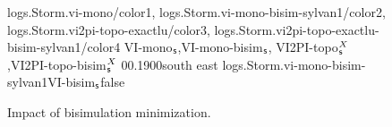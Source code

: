
\begin{figure*}[!htp]
	\centering
	{
		logs.Storm.vi-mono/color1,
		logs.Storm.vi-mono-bisim-sylvan1/color2,
		logs.Storm.vi2pi-topo-exactlu/color3,
		logs.Storm.vi2pi-topo-exactlu-bisim-sylvan1/color4
	}
	{VI-mono$_\textsf{s}$,VI-mono-bisim$_\textsf{s}$, VI2PI-topo$^X_\textsf{s}$,VI2PI-topo-bisim$^X_\textsf{s}$}
	{0}{\numcommunity}{0.1}{900}{south east}
%
		{logs.Storm.vi-mono-bisim-sylvan1}{VI-bisim$_\textsf{s}$}{false}
	\caption{Impact of bisimulation minimization.}
	\label{fig:bisim}
\end{figure*}

